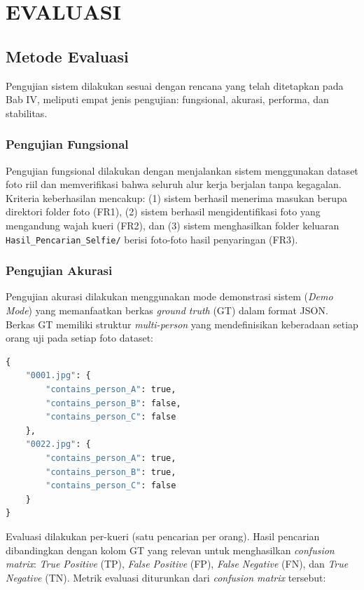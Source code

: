 \cleardoublepage
\chapter{EVALUASI}
\label{chap:evaluasi}

\section{Metode Evaluasi}

Pengujian sistem dilakukan sesuai dengan rencana yang telah ditetapkan pada Bab IV, meliputi empat jenis pengujian: fungsional, akurasi, performa, dan stabilitas.

\subsection{Pengujian Fungsional}

Pengujian fungsional dilakukan dengan menjalankan sistem menggunakan dataset foto riil dan memverifikasi bahwa seluruh alur kerja berjalan tanpa kegagalan. Kriteria keberhasilan mencakup: (1) sistem berhasil menerima masukan berupa direktori folder foto (FR1), (2) sistem berhasil mengidentifikasi foto yang mengandung wajah kueri (FR2), dan (3) sistem menghasilkan folder keluaran \texttt{Hasil\_Pencarian\_Selfie/} berisi foto-foto hasil penyaringan (FR3).

\subsection{Pengujian Akurasi}

Pengujian akurasi dilakukan menggunakan mode demonstrasi sistem (\textit{Demo Mode}) yang memanfaatkan berkas \textit{ground truth} (GT) dalam format JSON. Berkas GT memiliki struktur \textit{multi-person} yang mendefinisikan keberadaan setiap orang uji pada setiap foto dataset:

\begin{lstlisting}[language=Python, caption={Contoh Format Berkas \textit{Ground Truth} JSON}]
{
    "0001.jpg": {
        "contains_person_A": true,
        "contains_person_B": false,
        "contains_person_C": false
    },
    "0022.jpg": {
        "contains_person_A": true,
        "contains_person_B": true,
        "contains_person_C": false
    }
}
\end{lstlisting}

Evaluasi dilakukan per-kueri (satu pencarian per orang). Hasil pencarian dibandingkan dengan kolom GT yang relevan untuk menghasilkan \textit{confusion matrix}: \textit{True Positive} (TP), \textit{False Positive} (FP), \textit{False Negative} (FN), dan \textit{True Negative} (TN). Metrik evaluasi diturunkan dari \textit{confusion matrix} tersebut:

